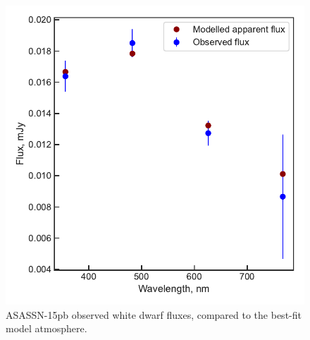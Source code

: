 \begin{figure}
    \centering
    \includegraphics[width=\textwidth]{figures/results/ASASSN-15pb/fluxplot.pdf}
    \caption{ASASSN-15pb observed white dwarf fluxes, compared to the best-fit model atmosphere.}
    \label{fig:ASASSN-15pb flux plot}
\end{figure}
\clearpage


